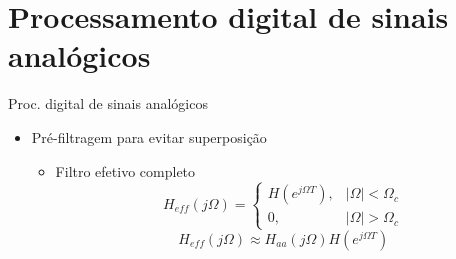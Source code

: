 \section{Processamento digital de sinais analógicos}
\begin{slide}{Proc. digital de sinais anal\'ogicos}
\begin{itemize}
 \item Pré-filtragem para evitar superposição
   \begin{itemize}
      \item Filtro efetivo completo
      \begin{equation}
         H_{eff}(j\Omega) = \begin{cases}H(e^{j\Omega T}), & |\Omega|<\Omega_c\\ 0, & |\Omega|>\Omega_c                          \end{cases}
      \end{equation}
      \begin{equation}
         H_{eff}(j\Omega) \approx H_{aa}(j\Omega) H(e^{j\Omega T})
      \end{equation}
   \end{itemize}
\end{itemize}
\end{slide}



